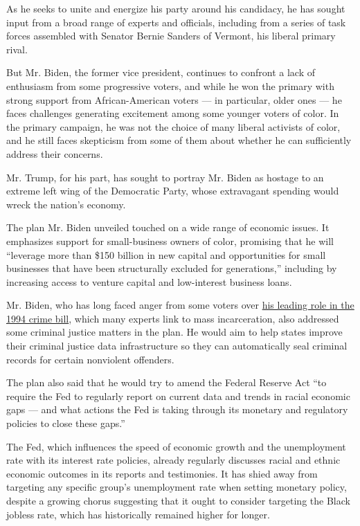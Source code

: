 As he seeks to unite and energize his party around his candidacy, he has
sought input from a broad range of experts and officials, including from
a series of task forces assembled with Senator Bernie Sanders of
Vermont, his liberal primary rival.

But Mr. Biden, the former vice president, continues to confront a lack
of enthusiasm from some progressive voters, and while he won the primary
with strong support from African-American voters --- in particular,
older ones --- he faces challenges generating excitement among some
younger voters of color. In the primary campaign, he was not the choice
of many liberal activists of color, and he still faces skepticism from
some of them about whether he can sufficiently address their concerns.

Mr. Trump, for his part, has sought to portray Mr. Biden as hostage to
an extreme left wing of the Democratic Party, whose extravagant spending
would wreck the nation's economy.

The plan Mr. Biden unveiled touched on a wide range of economic issues.
It emphasizes support for small-business owners of color, promising that
he will ``leverage more than \$150 billion in new capital and
opportunities for small businesses that have been structurally excluded
for generations,'' including by increasing access to venture capital and
low-interest business loans.

Mr. Biden, who has long faced anger from some voters over
\href{https://www.nytimes.com/2019/06/25/us/joe-biden-crime-laws.html}{his
leading role in the 1994 crime bill}, which many experts link to mass
incarceration, also addressed some criminal justice matters in the plan.
He would aim to help states improve their criminal justice data
infrastructure so they can automatically seal criminal records for
certain nonviolent offenders.

The plan also said that he would try to amend the Federal Reserve Act
``to require the Fed to regularly report on current data and trends in
racial economic gaps --- and what actions the Fed is taking through its
monetary and regulatory policies to close these gaps.''

The Fed, which influences the speed of economic growth and the
unemployment rate with its interest rate policies, already regularly
discusses racial and ethnic economic outcomes in its reports and
testimonies. It has shied away from targeting any specific group's
unemployment rate when setting monetary policy, despite a growing chorus
suggesting that it ought to consider targeting the Black jobless rate,
which has historically remained higher for longer.

